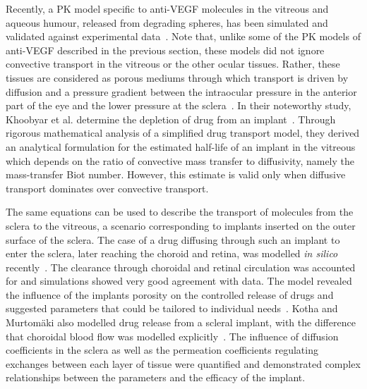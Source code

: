\documentclass{article}
\begin{document}
Recently, a PK model specific to anti-VEGF molecules in the vitreous and aqueous humour, released from degrading spheres, has been simulated and validated against experimental data~\cite{Heljak_2022}.
Note that, unlike some of the PK models of anti-VEGF described in the previous section, these models did not ignore convective transport in the vitreous or the other ocular tissues.
Rather, these tissues are considered as porous mediums through which transport is driven by diffusion and a pressure gradient between the intraocular pressure in the anterior part of the eye and the lower pressure at the sclera~\cite{Ferreira_2018,Ferreira_2020,Heljak_2022,Khoobyar_2021,Li_2022a}.
In their noteworthy study, Khoobyar et al. determine the depletion of drug from an implant~\cite{Khoobyar_2022}.
Through rigorous mathematical analysis of a simplified drug transport model, they derived an analytical formulation for the estimated half-life of an implant in the vitreous which depends on the ratio of convective mass transfer to diffusivity, namely the mass-transfer Biot number.
However, this estimate is valid only when diffusive transport dominates over convective transport.



The same equations can be used to describe the transport of molecules from the sclera to the vitreous, a scenario corresponding to implants inserted on the outer surface of the sclera.
The case of a drug diffusing through such an implant to enter the sclera, later reaching the choroid and retina, was modelled \textit{in silico} recently~\cite{Abootorabi_2021}.
The clearance through choroidal and retinal circulation was accounted for and simulations showed very good agreement with data.
The model revealed the influence of the implants porosity on the controlled release of drugs and suggested parameters that could be tailored to individual needs~\cite{Abootorabi_2021}.
Kotha and Murtom\"aki also modelled drug release from a scleral implant, with the difference that choroidal blood flow was modelled explicitly~\cite{Kotha_2014}.
The influence of diffusion coefficients in the sclera as well as the permeation coefficients regulating exchanges between each layer of tissue were quantified and demonstrated complex relationships between the parameters and the efficacy of the implant.
\end{document}
